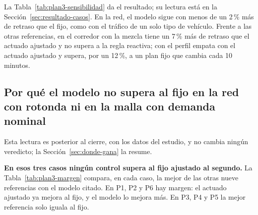 La Tabla~\ref{tab:plan3-sensibilidad} da el resultado; su lectura está
en la Sección~\ref{sec:resultado-casos}. En la red, el modelo sigue con
menos de un 2\,\% más de retraso que el fijo, como con el tráfico de un
solo tipo de vehículo. Frente a las otras referencias, en el corredor
con la mezcla tiene un 7\,\% más de retraso que el actuado ajustado y no
supera a la regla reactiva; con el perfil empata con el actuado ajustado
y supera, por un 12\,\%, a un plan fijo que cambia cada 10 minutos.

\begin{table}[H]
\centering
\footnotesize
\setlength{\tabcolsep}{3pt}

\caption[Segundo estudio: sensibilidad a la mezcla de vehículos y al perfil de demanda]{Sensibilidad con llegadas aleatorias: cambio del retraso total de IPPO con mensajes corregido, entrenado con cada tráfico, frente al fijo ajustado al segundo con ese tráfico. El arranque lento solo se usa al evaluar. Las columnas se leen como en la Tabla~\ref{tab:plan3-aleatorias}.}
\label{tab:plan3-sensibilidad}
\end{table}

\subsection*{Por qué el modelo no supera al fijo en la red con rotonda ni en la malla con demanda nominal}

Esta lectura es posterior al cierre, con los datos del estudio, y no
cambia ningún veredicto; la Sección~\ref{sec:donde-gana} la resume.

\textbf{En esos tres casos ningún control supera al fijo ajustado al
segundo.} La Tabla~\ref{tab:plan3-margen} compara, en cada caso, la
mejor de las otras nueve referencias con el modelo citado. En P1, P2 y
P6 hay margen: el actuado ajustado ya mejora al fijo, y el modelo lo
mejora más. En P3, P4 y P5 la mejor referencia solo iguala al fijo.

